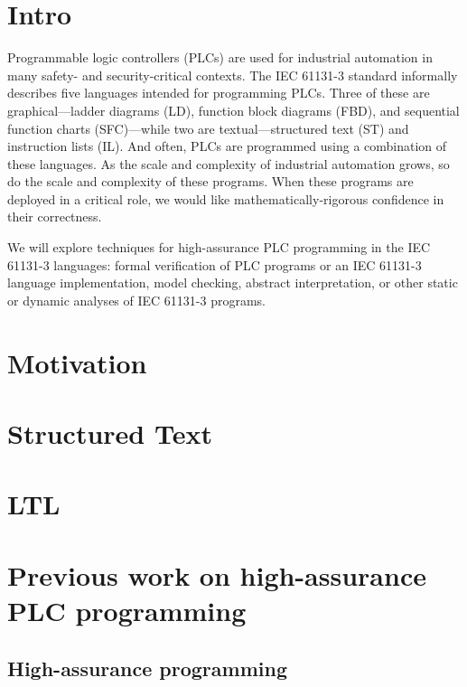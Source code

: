 % 

\section{Intro}

Programmable logic controllers (PLCs) are used for industrial automation in many
safety- and security-critical contexts. The IEC 61131-3 standard informally
describes five languages intended for programming PLCs. Three of these are
graphical---ladder diagrams (LD), function block diagrams (FBD), and sequential
function charts (SFC)---while two are textual---structured text (ST) and
instruction lists (IL). And often, PLCs are programmed using a combination of
these languages. As the scale and complexity of industrial automation grows, so
do the scale and complexity of these programs. When these programs are deployed
in a critical role, we would like mathematically-rigorous confidence in their
correctness.

We will explore techniques for high-assurance PLC programming in the IEC 61131-3
languages: formal verification of PLC programs or an IEC 61131-3 language
implementation, model checking, abstract interpretation, or other static or
dynamic analyses of IEC 61131-3 programs.

\section{Motivation}

\section{Structured Text}

\section{LTL}

\section{Previous work on high-assurance PLC programming}

\subsection{High-assurance programming}

